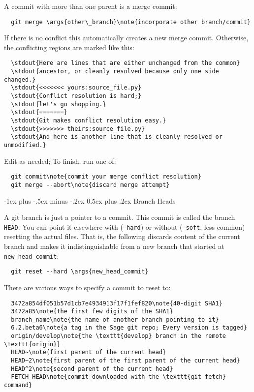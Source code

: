 \documentclass[10pt,landscape,a4paper]{article}
\makeatletter
\renewcommand{\section}{\@startsection{section}{1}{0mm}%
                                {-1ex plus -.5ex minus -.2ex}%
                                {0.5ex plus .2ex}%
                                {\normalfont\Large\bfseries}}
\makeatother
\begin{document}
\begin{multicols}{3}
A commit with more than one parent is a merge commit:
\begin{Verbatim}
  git merge \args{other\_branch}\note{incorporate other branch/commit}
\end{Verbatim}
If there is no conflict this automatically creates a new merge
commit. Otherwise, the conflicting regions are marked like this:
\begin{Verbatim}
  \stdout{Here are lines that are either unchanged from the common}
  \stdout{ancestor, or cleanly resolved because only one side changed.}
  \stdout{<<<<<<< yours:source_file.py}
  \stdout{Conflict resolution is hard;}
  \stdout{let's go shopping.}
  \stdout{=======}
  \stdout{Git makes conflict resolution easy.}
  \stdout{>>>>>>> theirs:source_file.py}
  \stdout{And here is another line that is cleanly resolved or unmodified.}
\end{Verbatim}
Edit as needed; To finish, run one of:
\begin{Verbatim}
  git commit\note{commit your merge conflict resolution}
  git merge --abort\note{discard merge attempt}
\end{Verbatim}


\section{Branch Heads}

A git branch is just a pointer to a commit. This commit is called the
branch \texttt{HEAD}. You can point it elsewhere with
(\texttt{--hard}) or without (\texttt{--soft}, less common) resetting
the actual files. That is, the following discards content of the
current branch and makes it indistinguishable from a new branch that
started at \verb!new_head_commit!:
\begin{Verbatim}
  git reset --hard \args{new_head_commit}
\end{Verbatim}

There are various ways to specify a commit to reset to:
\begin{Verbatim}
  3472a854df051b57d1cb7e4934913f17f1fef820\note{40-digit SHA1}
  3472a85\note{the first few digits of the SHA1}
  branch_name\note{the name of another branch pointing to it}
  6.2.beta6\note{a tag in the Sage git repo; Every version is tagged}
  origin/develop\note{the \texttt{develop} branch in the remote \texttt{origin}}
  HEAD~\note{first parent of the current head}
  HEAD~2\note{first parent of the first parent of the current head}
  HEAD^2\note{second parent of the current head}
  FETCH_HEAD\note{commit downloaded with the \texttt{git fetch} command}
\end{Verbatim}



\end{multicols}
\end{document}
